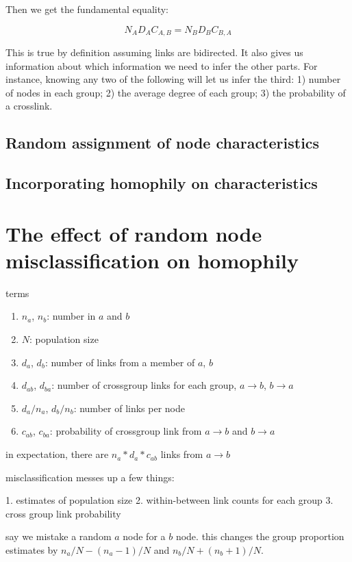 \documentclass[a4paper]{article}
\begin{document}
Then we get the fundamental equality:

\begin{equation}
N_A D_A C_{A,B} = N_B D_B C_{B,A}
\end{equation}

This is true by definition assuming links are bidirected. It also gives us information about which information we need to infer the other parts. For instance, knowing any two of the following will let us infer the third: 1) number of nodes in each group; 2) the average degree of each group; 3) the probability of a crosslink.



\subsection{Random assignment of node characteristics}

\subsection{Incorporating homophily on characteristics}


\section{The effect of random node misclassification on homophily}

terms

\begin{enumerate}
\item $n_a$, $n_b$: number in $a$ and $b$
\item $N$: population size
\item $d_a$, $d_b$: number of links from a member of $a$, $b$
\item $d_{ab}$, $d_{ba}$: number of crossgroup links for each group, $a\to b$, $b\to a$
\item $d_a/n_a$, $d_b/n_b$: number of links per node
\item $c_{ab}$, $c_{ba}$: probability of crossgroup link from $a\to b$ and $b\to a$
\end{enumerate}

in expectation, there are $n_a * d_a * c_{ab}$ links from $a\to b$

misclassification messes up a few things:

1. estimates of population size
2. within-between link counts for each group
3. cross group link probability

say we mistake a random $a$ node for a $b$ node. this changes the group proportion estimates by $n_a/N - (n_a - 1)/N$ and $n_b/N + (n_b + 1)/N$.
\end{document}
